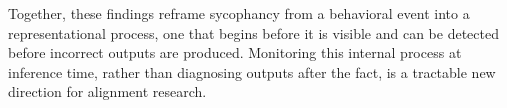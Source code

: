 \documentclass[11pt]{article}
\begin{document}
Together, these findings reframe sycophancy from a behavioral event into a representational
process, one that begins before it is visible and can be detected before incorrect outputs
are produced. Monitoring this internal process at inference time, rather than diagnosing
outputs after the fact, is a tractable new direction for alignment research.








\end{document}
